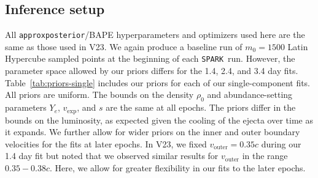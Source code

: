 \documentclass[twocolumn, twocolappendix]{aastex63}
\def\SPARK{\texttt{SPARK}}
\def\TARDIS{\texttt{TARDIS}}
\def\eg{{\it e.g.}}
\begin{document}




\subsection{Inference setup}\label{ssc:inference-setup}

All \texttt{approxposterior}/BAPE hyperparameters and optimizers used here are the same as those used in V23. We again produce a baseline run of $m_{0} = 1500$ Latin Hypercube sampled points at the beginning of each \SPARK~run. However, the parameter space allowed by our priors differs for the 1.4, 2.4, and 3.4 day fits. Table~\ref{tab:priors-single} includes our priors for each of our single-component fits. All priors are uniform. The bounds on the density $\rho_0$ and abundance-setting parameters $Y_e$, $v_{\mathrm{exp}}$, and $s$ are the same at all epochs. The priors differ in the bounds on the luminosity, as expected given the cooling of the ejecta over time as it expands. We further allow for wider priors on the inner and outer boundary velocities for the fits at later epochs. In V23, we fixed $v_{\mathrm{outer}} = 0.35c$ during our 1.4 day fit but noted that we observed similar results for $v_{\mathrm{outer}}$ in the range $0.35 - 0.38c$. Here, we allow for greater flexibility in our fits to the later epochs.
    
\end{document}

